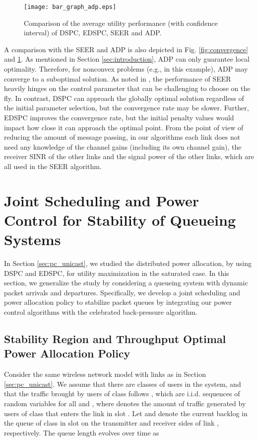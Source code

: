 \documentclass[10pt,journal,letterpaper,compsoc]{IEEEtran}
\begin{document}
{{\begin{figure}[t]
\begin{center}
\vspace{-0.0cm}\hspace{0cm} {\texttt{[image: bar\_graph\_adp.eps]}}\hspace{-0cm}
\vspace{0cm} \caption{Comparison of the average utility performance (with confidence interval) of DSPC, EDSPC, SEER and ADP.}\vspace{-0.0cm}
\label{fig:comparison}
\end{center}
\end{figure}

A comparison with the SEER and ADP is also depicted in Fig. \ref{fig:convergence} and \ref{fig:comparison}. As mentioned in Section \ref{sec:introduction}, ADP can only guarantee local optimality. Therefore, for nonconvex problems (e.g., in this example), ADP may converge to a suboptimal solution. As noted in \cite{qian:2010}, the performance of SEER heavily hinges on the control parameter that can be challenging to choose on the fly. In contrast, DSPC can approach the globally optimal solution regardless of the initial parameter selection, but the convergence rate may be slower. Further, EDSPC improves the convergence rate, but the initial penalty values would impact how close it can approach the optimal point. From the point of view of reducing the amount of message passing, in our algorithms each link does not need any knowledge of the channel gains (including its own channel gain), the receiver SINR of the other links and the signal power of the other links, which are all used in the SEER algorithm.


\section{Joint Scheduling and Power Control for Stability of Queueing Systems}\label{sec:stability}
In Section \ref{sec:pc_unicast}, we studied the distributed power allocation, by using DSPC and EDSPC, for utility maximization in the saturated case. In this section, we generalize the study by considering a queueing system with dynamic packet arrivals and departures. Specifically, we develop a joint scheduling and power allocation policy to stabilize packet queues by integrating our power control algorithms with the celebrated back-pressure algorithm\cite{ephremides:1992}.


\subsection{Stability Region and Throughput Optimal Power Allocation Policy}
Consider the same wireless network model with  links as in Section \ref{sec:pc_unicast}. We assume that there are  classes of users in the system, and that the traffic brought by users of class  follows , which are i.i.d. sequences of random variables for all  and , where  denotes the amount of traffic generated by users of class  that enters the link  in slot . Let  and  denote the current backlog in the queue of class  in slot  on the transmitter and receiver sides of link , respectively. The queue length  evolves over time as

}}
\end{document}

